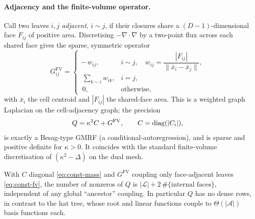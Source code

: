 \documentclass[11pt]{article}
\begin{document}
\paragraph{Adjacency and the finite-volume operator.}
Call two leaves $i,j$ \emph{adjacent}, $i\sim j$, if their closures share a
$(D{-}1)$-dimensional face $F_{ij}$ of positive area.  Discretising
$-\nabla\cdot\nabla$ by a two-point flux across each shared face gives the
sparse, symmetric operator
\begin{equation}
  G^{\mathrm{FV}}_{ij} =
  \begin{cases}
    -\,w_{ij}, & i\sim j,\quad
      w_{ij}=\dfrac{|F_{ij}|}{\lVert \bar x_i-\bar x_j\rVert},\\[1.2ex]
    \ \sum_{k\sim i} w_{ik}, & i=j,\\[0.6ex]
    \ 0, & \text{otherwise},
  \end{cases}
  \label{eq:const-fv}
\end{equation}
with $\bar x_i$ the cell centroid and $|F_{ij}|$ the shared-face area.  This is a
weighted graph Laplacian on the cell-adjacency graph; the precision
\begin{equation}
  Q = \kappa^2 C + G^{\mathrm{FV}},
  \qquad C=\operatorname{diag}(|C_i|),
  \label{eq:const-Q}
\end{equation}
is exactly a Besag-type GMRF (a conditional-autoregression), and is sparse and
positive definite for $\kappa>0$.  It coincides with the standard finite-volume
discretisation of $(\kappa^2-\Delta)$ on the dual mesh.

\begin{proposition}
\label{prop:const-sparse}
With $C$ diagonal \eqref{eq:const-mass} and $G^{\mathrm{FV}}$ coupling only
face-adjacent leaves \eqref{eq:const-fv}, the number of nonzeros of $Q$ is
$|\mathcal{L}| + 2\,\#\{\text{internal faces}\}$, independent of any global
``ancestor'' coupling.  In particular $Q$ has no dense rows, in contrast to the
hat tree, whose root and linear functions couple to $\Theta(|\mathcal{A}|)$ basis
functions each.
\end{proposition}
\end{document}
